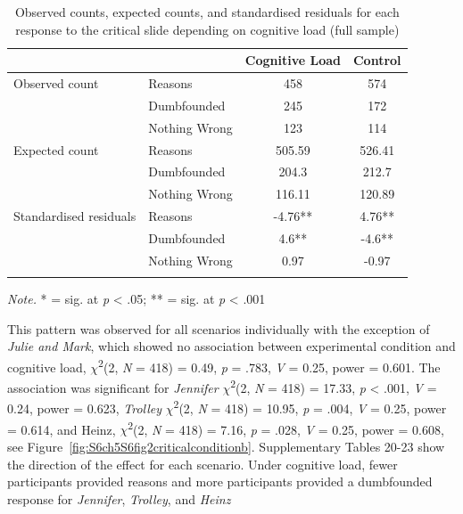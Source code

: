 \documentclass[
  american,
  man,floatsintext]{apa7}
\begin{document}
\begin{table}[tbp]

\begin{center}
\begin{threeparttable}

\caption{\label{tab:S6tab1dumb}Observed counts, expected counts, and standardised residuals for each response to the critical slide depending on cognitive load (full sample)}

\begin{tabular}{llcc}
\toprule
 & \multicolumn{1}{c}{} & \multicolumn{1}{c}{Cognitive Load} & \multicolumn{1}{c}{Control}\\
\midrule
Observed count & Reasons & 458 & 574\\
 & Dumbfounded & 245 & 172\\
 & Nothing Wrong & 123 & 114\\
Expected count & Reasons & 505.59 & 526.41\\
 & Dumbfounded & 204.3 & 212.7\\
 & Nothing Wrong & 116.11 & 120.89\\
Standardised residuals & Reasons & -4.76** & 4.76**\\
 & Dumbfounded & 4.6** & -4.6**\\
 & Nothing Wrong & 0.97 & -0.97\\
\bottomrule
\addlinespace
\end{tabular}

\begin{tablenotes}[para]
\normalsize{\textit{Note.} * = sig. at \emph{p} < .05; ** = sig. at \emph{p} < .001}
\end{tablenotes}

\end{threeparttable}
\end{center}

\end{table}

\newpage

This pattern was observed for all scenarios individually with the exception of \emph{Julie and Mark}, which showed no association between experimental condition and cognitive load, \(\chi\)\textsuperscript{2}(2, \emph{N} = 418) = 0.49, \emph{p} = .783, \emph{V} = 0.25, power = 0.601. The association was significant for \emph{Jennifer} \(\chi\)\textsuperscript{2}(2, \emph{N} = 418) = 17.33, \emph{p} \textless{} .001, \emph{V} = 0.24, power = 0.623, \emph{Trolley} \(\chi\)\textsuperscript{2}(2, \emph{N} = 418) = 10.95, \emph{p} = .004, \emph{V} = 0.25, power = 0.614, and Heinz, \(\chi\)\textsuperscript{2}(2, \emph{N} = 418) = 7.16, \emph{p} = .028, \emph{V} = 0.25, power = 0.608, see Figure~\ref{fig:S6ch5S6fig2criticalconditionb}. Supplementary Tables 20-23 show the direction of the effect for each scenario. Under cognitive load, fewer participants provided reasons and more participants provided a dumbfounded response for \emph{Jennifer}, \emph{Trolley}, and \emph{Heinz}
\end{document}
